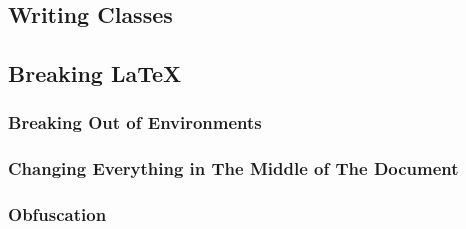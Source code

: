 \subsection{Writing Classes}


\subsection{Breaking \LaTeX}
\subsubsection{Breaking Out of Environments}
\subsubsection{Changing Everything in The Middle of The Document}
\subsubsection{Obfuscation}